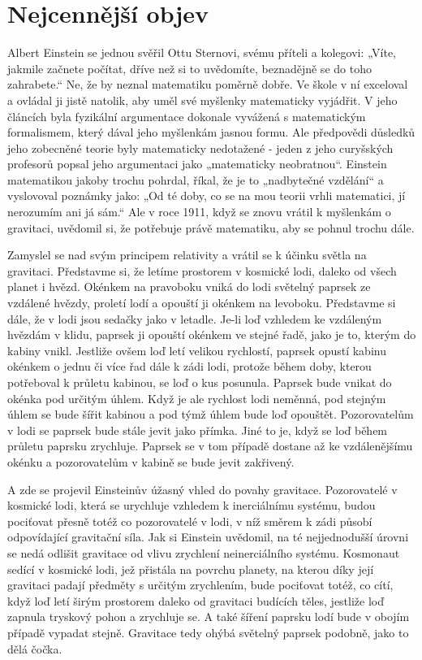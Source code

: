 \section{Nejcennější objev}\label{feyIchIIIsecIII}
  Albert Einstein se jednou svěřil Ottu Sternovi, svému příteli a kolegovi: „Víte, jakmile začnete
  počítat, dříve než si to uvědomíte, beznadějně se do toho zahrabete.“ Ne, že by neznal matematiku
  poměrně dobře. Ve škole v ní exceloval a ovládal ji jistě natolik, aby uměl své myšlenky
  matematicky vyjádřit. V jeho článcích byla fyzikální argumentace dokonale vyvážená s matematickým
  formalismem, který dával jeho myšlenkám jasnou formu. Ale předpovědi důsledků jeho zobecněné
  teorie byly matematicky nedotažené - jeden z jeho curyšských profesorů popsal jeho argumentaci
  jako „matematicky neobratnou“. Einstein matematikou jakoby trochu pohrdal, říkal, že je to
  „nadbytečné vzdělání“ a vyslovoval poznámky jako: „Od té doby, co se na mou teorii vrhli
  matematici, jí nerozumím ani já sám.“ Ale v roce 1911, když se znovu vrátil k myšlenkám o
  gravitaci, uvědomil si, že potřebuje právě matematiku, aby se pohnul trochu dále. 
  
  Zamyslel se nad svým principem relativity a vrátil se k účinku světla na gravitaci. Představme si,
  že letíme prostorem v kosmické lodi, daleko od všech planet i hvězd. Okénkem na pravoboku vniká do
  lodi světelný paprsek ze vzdálené hvězdy, proletí lodí a opouští ji okénkem na levoboku.
  Představme si dále, že v lodi jsou sedačky jako v letadle. Je-li loď vzhledem ke vzdáleným hvězdám
  v klidu, paprsek ji opouští okénkem ve stejné řadě, jako je to, kterým do kabiny vnikl. Jestliže
  ovšem loď letí velikou rychlostí, paprsek opustí kabinu okénkem o jednu či více řad dále k zádi
  lodi, protože během doby, kterou potřeboval k průletu kabinou, se loď o kus posunula. Paprsek bude
  vnikat do okénka pod určitým úhlem. Když je ale rychlost lodi neměnná, pod stejným úhlem se bude
  šířit kabinou a pod týmž úhlem bude loď opouštět. Pozorovatelům v lodi se paprsek bude stále jevit
  jako přímka. Jiné to je, když se loď během průletu paprsku zrychluje. Paprsek se v tom případě
  dostane až ke vzdálenějšímu okénku a pozorovatelům v kabině se bude jevit zakřivený. 
  
  A zde se projevil Einsteinův úžasný vhled do povahy gravitace. Pozorovatelé v kosmické lodi, která
  se urychluje vzhledem k inerciálnímu systému, budou pociťovat přesně totéž co pozorovatelé v lodi,
  v níž směrem k zádi působí odpovídající gravitační síla. Jak si Einstein uvědomil, na té
  nejjednodušší úrovni se nedá odlišit gravitace od vlivu zrychlení neinerciálního systému.
  Kosmonaut sedící v kosmické lodi, jež přistála na povrchu planety, na kterou díky její gravitaci
  padají předměty s určitým zrychlením, bude pociťovat totéž, co cítí, když loď letí širým prostorem
  daleko od gravitaci budících těles, jestliže loď zapnula tryskový pohon a zrychluje se. A také
  šíření paprsku lodí bude v obojím případě vypadat stejně. Gravitace tedy ohýbá světelný paprsek
  podobně, jako to dělá čočka. 
  
